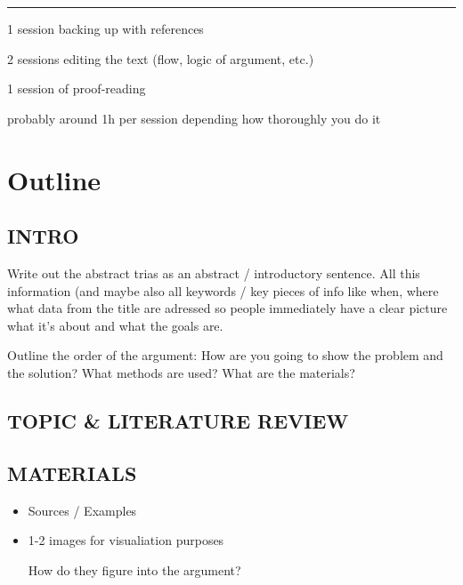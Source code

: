 \documentclass{article}
\begin{document}
\begin{minipage}[t]{0.5\textwidth}
\begin{tcolorbox}
\hrule

\begin{itemize} {\bf
    \item 1 session backing up with references
    \item 2 sessions editing the text (flow, logic of argument, etc.)
    \item 1 session of proof-reading }
    {\scriptsize probably around 1h per session depending how thoroughly you do it}
\end{itemize}
\end{tcolorbox}

\end{minipage}


\clearpage
\section{Outline}

\begin{tcolorbox}
\subsection*{\MakeUppercase{Intro}}
{\scriptsize Write out the abstract trias as an abstract / introductory sentence. All this information (and maybe also all keywords / key pieces of info like when, where what data from the title are adressed so people immediately have a clear picture what it's about and what the goals are.

Outline the order of the argument: How are you going to show the problem and the solution? What methods are used? What are the materials?}
\color{white}\lipsum[75]\end{tcolorbox}


\begin{tcolorbox}\subsection*{\MakeUppercase{Topic \& Literature Review}}\color{white}\lipsum[75]\end{tcolorbox}

\begin{tcolorbox}\subsection*{\MakeUppercase{Materials}}
\begin{itemize}\footnotesize
    \item Sources / Examples
    \item 1-2 images for visualiation purposes
    {\scriptsize How do they figure into the argument?
    
    }
\end{itemize}
\color{white}\lipsum[75]\end{tcolorbox}
\end{document}
